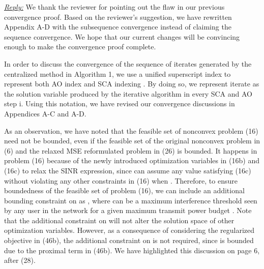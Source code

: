
\vspace{1eM}
\underline{\textit{Reply:}} We thank the reviewer for pointing out the flaw in our previous convergence proof. Based on the reviewer's suggestion, we have rewritten Appendix A-D with the subsequence convergence instead of claiming the sequence convergence. We hope that our current changes will be convincing enough to make the convergence proof complete.

In order to discuss the convergence of the sequence of iterates generated by the centralized method in Algorithm 1, we use a unified superscript index  to represent both \ac{AO} index  and \ac{SCA} indexing . By doing so, we represent iterate  as the solution variable produced by the iterative algorithm in every \ac{SCA}  and \ac{AO} step {i}. Using this notation, we have revised our convergence discussions in Appendices A-C and A-D. 

As an observation, we have noted that the feasible set of nonconvex problem (16) need not be bounded, even if the feasible set of the original nonconvex problem in (6) and the relaxed \ac{MSE} reformulated problem in (26) is bounded. It happens in problem (16) because of the newly introduced optimization variables in (16b) and (16c) to relax the \ac{SINR} expression, since  can assume any value satisfying (16c) without violating any other constraints in (16) when . Therefore, to ensure boundedness of the feasible set of problem (16), we can include an additional bounding constraint on  as , where  can be a maximum interference threshold seen by any user in the network for a given maximum transmit power budget . Note that the additional constraint on  will not alter the solution space of other optimization variables. However, as a consequence of considering the regularized objective in (46b), the additional constraint on  is not required, since  is bounded due to the proximal term in (46b). We have highlighted this discussion on page 6, after (28). 

